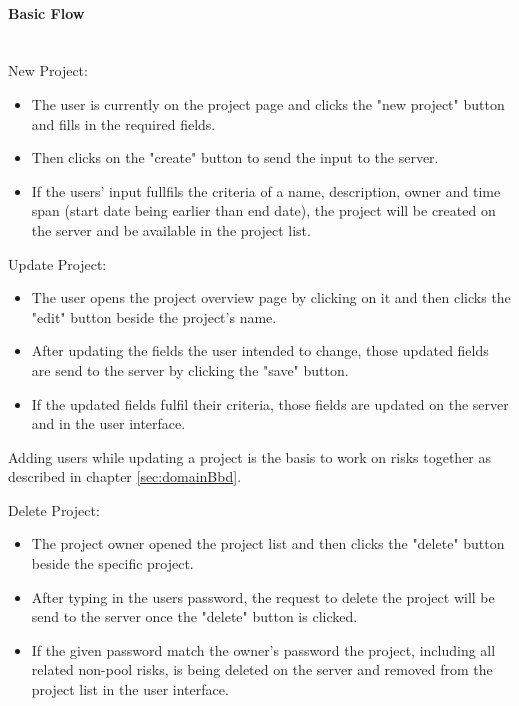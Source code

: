 \paragraph*{Basic Flow} \mbox{}\\
\noindent
New Project:
\begin{itemize}
	\vspace{-3mm}
	\setlength\itemsep{-1em}
	
	\item The user is currently on the project page and clicks the "new project" button and fills in the required fields.
	\item Then clicks on the "create" button to send the input to the server.
	\item If the users' input fullfils the criteria of a name, description, owner and time span (start date being earlier than end date), the project will be created on the server and be available in the project list.
\end{itemize}

\noindent
Update Project: 
\begin{itemize}
	\vspace{-3mm}
	\setlength\itemsep{-1em}
	\item The user opens the project overview page by clicking on it and then clicks the "edit" button beside the project's name.
	\item After updating the fields the user intended to change, those updated fields are send to the server by clicking the "save" button.
	\item If the updated fields fulfil their criteria, those fields are updated on the server and in the user interface.
\end{itemize} 
Adding users while updating a project is the basis to work on risks together as described in chapter \ref{sec:domainBbd}.

\noindent
Delete Project:
\begin{itemize}
	\vspace{-3mm}
	\setlength\itemsep{-1em}
	\item The project owner opened the project list and then clicks the "delete" button beside the specific project. 
	\item After typing in the users password, the request to delete the project will be send to the server once the "delete" button is clicked.
	\item If the given password match the owner's password the project, including all related non-pool risks, is being deleted on the server and removed from the project list in the user interface.
\end{itemize}

